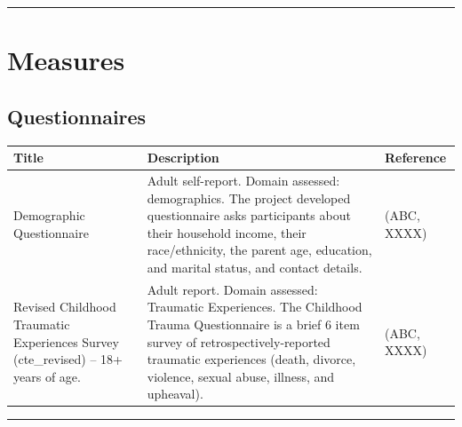 \documentclass[]{book}
\begin{document}
\begin{center}\rule{0.5\linewidth}{0.5pt}\end{center}

\hypertarget{measures-1}{%
\section{Measures}\label{measures-1}}

\hypertarget{questionnaires-1}{%
\subsection{Questionnaires}\label{questionnaires-1}}

\begin{longtable}[]{@{}lll@{}}
\toprule
\begin{minipage}[b]{0.32\columnwidth}\raggedright
Title\strut
\end{minipage} & \begin{minipage}[b]{0.32\columnwidth}\raggedright
Description\strut
\end{minipage} & \begin{minipage}[b]{0.27\columnwidth}\raggedright
Reference\strut
\end{minipage}\tabularnewline
\midrule
\endhead
\begin{minipage}[t]{0.32\columnwidth}\raggedright
Demographic Questionnaire\strut
\end{minipage} & \begin{minipage}[t]{0.32\columnwidth}\raggedright
Adult self-report. Domain assessed: demographics. The project developed questionnaire asks participants about their household income, their race/ethnicity, the parent age, education, and marital status, and contact details.\strut
\end{minipage} & \begin{minipage}[t]{0.27\columnwidth}\raggedright
(ABC, XXXX)\strut
\end{minipage}\tabularnewline
\begin{minipage}[t]{0.32\columnwidth}\raggedright
Revised Childhood Traumatic Experiences Survey (cte\_revised) -- 18+ years of age.\strut
\end{minipage} & \begin{minipage}[t]{0.32\columnwidth}\raggedright
Adult report. Domain assessed: Traumatic Experiences. The Childhood Trauma Questionnaire is a brief 6 item survey of retrospectively-reported traumatic experiences (death, divorce, violence, sexual abuse, illness, and upheaval).\strut
\end{minipage} & \begin{minipage}[t]{0.27\columnwidth}\raggedright
(ABC, XXXX)\strut
\end{minipage}\tabularnewline
\bottomrule
\end{longtable}

\begin{center}\rule{0.5\linewidth}{0.5pt}\end{center}


\end{document}

